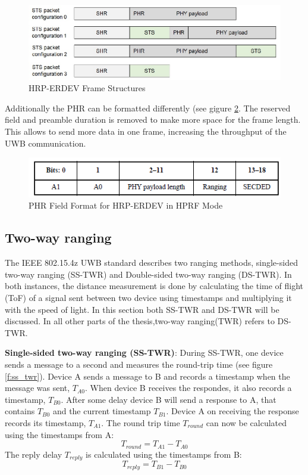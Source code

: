 \begin{figure}[ht!]
\centering
\includegraphics[width=\linewidth]{graphics/HRP_ERDEV_frame_structures.jpg}
\caption{HRP-ERDEV Frame Structures \cite{hsu_2021}}
\label{f:HRP-erdev frame}
\end{figure}

Additionally the PHR can be formatted differently (see gigure \ref{f:PHR 4z}. 
The reserved field and preamble duration is removed to make more space for the frame length. This allows to send more data in one frame, increasing the throughput of the UWB communication.

\begin{figure}[ht!]
\centering
\includegraphics[width=\linewidth]{graphics/HRP_ERDEV_HPRF_mode_PHR.png}
\caption{PHR Field Format for HRP-ERDEV in HPRF Mode \cite{IEEE4z}}
\label{f:PHR 4z}
\end{figure}


\subsection{Two-way ranging}
\label{ss:two_way_ranging}
The IEEE 802.15.4z UWB standard describes two ranging methods, single-sided two-way ranging (SS-TWR) and Double-sided two-way ranging (DS-TWR).
In both instances, the distance measurement is done by calculating the time of flight (ToF) of a signal sent between two device using timestamps and multiplying it with the speed of light. 
In this section both SS-TWR and DS-TWR will be discussed.
In all other parts of the thesis,two-way ranging(TWR) refers to DS-TWR.

\textbf{Single-sided two-way ranging (SS-TWR)}:
During  SS-TWR, one device sends a message to a second and measures the round-trip time (see figure \ref{f:ss_twr}).
Device A sends a message to B and records a timestamp when the message was sent, $T_{A0}$.
When device B receives the respondes, it also records a timestamp, $T_{B0}$.
After some delay device B will send a response to A, that contains $T_{B0}$ and the current timestamp $T_{B1}$.
Device A on receiving the response records its timestamp, $T_{A1}$.
The round trip time $T_{round}$ can now be calculated using the timestamps from A:
\begin{equation}
	\mbox{$T_{round}$} =
	\mbox{$T_{A1} - T_{A0}$}
\end{equation}
The reply delay $T_{reply}$ is calculated using the timestamps from B:
\begin{equation}
	\mbox{$T_{reply}$} =
	\mbox{$T_{B1} - T_{B0}$}
\end{equation}

